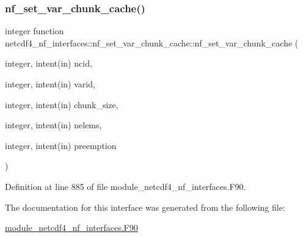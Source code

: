 \subsubsection{\texorpdfstring{nf\+\_\+set\+\_\+var\+\_\+chunk\+\_\+cache()}{nf\_set\_var\_chunk\_cache()}}
{\footnotesize\ttfamily integer function netcdf4\+\_\+nf\+\_\+interfaces\+::nf\+\_\+set\+\_\+var\+\_\+chunk\+\_\+cache\+::nf\+\_\+set\+\_\+var\+\_\+chunk\+\_\+cache (\begin{DoxyParamCaption}\item[{integer, intent(in)}]{ncid,  }\item[{integer, intent(in)}]{varid,  }\item[{integer, intent(in)}]{chunk\+\_\+size,  }\item[{integer, intent(in)}]{nelems,  }\item[{integer, intent(in)}]{preemption }\end{DoxyParamCaption})}



Definition at line 885 of file module\+\_\+netcdf4\+\_\+nf\+\_\+interfaces.\+F90.



The documentation for this interface was generated from the following file\+:\begin{DoxyCompactItemize}
\item 
\hyperlink{module__netcdf4__nf__interfaces_8F90}{module\+\_\+netcdf4\+\_\+nf\+\_\+interfaces.\+F90}\end{DoxyCompactItemize}
